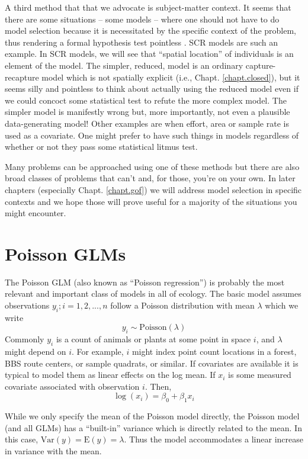 A third method that that we advocate is subject-matter
context. It seems that there are some situations -- some models -- where one should not
have to do model selection because it is necessitated by the specific
context of the problem, thus rendering a formal hypothesis test pointless
\citep{johnson:1999}.
SCR models are such an example. In SCR models, we will see that
``spatial location'' of individuals is an element of the model. The
simpler, reduced, model is an ordinary capture-recapture model which
is not spatially explicit (i.e., Chapt. \ref{chapt.closed}),
but it seems silly and pointless to think about actually using the
reduced model even if we could concoct some statistical test to refute
the more complex model.  The simpler model is manifestly wrong but,
more importantly, not even a plausible data-generating model!
Other examples are when effort, area or
sample rate is used as a covariate. One might prefer to have such things in
models regardless of whether or not they pass some statistical litmus
test.

Many problems can be approached using one of these methods but there
are also broad classes of problems that can't and, for those, you're
on your own. In later chapters (especially Chapt. \ref{chapt.gof}) we will address model selection in
specific contexts and we hope those will prove useful for a majority
of the situations you might encounter.


\section{Poisson GLMs}
\label{glms.sec.poisson}

The Poisson GLM (also known as ``Poisson regression'') is probably the
most relevant and important class of models in all of ecology. The
basic model assumes observations $y_{i}; i=1,2,...,n$ follow a Poisson
distribution with mean $\lambda$ which we write
\[
 	y_{i} \sim \mbox{Poisson}(\lambda)
\]
Commonly $y_{i}$ is a count of animals or plants at some point in
space $i$, and $\lambda$ might depend on $i$. For example, $i$ might index point
count locations in a forest, BBS route centers, or sample quadrats, or
similar.  If covariates are available it is typical to model them as
linear effects on the log mean. If $x_i$ is some measured covariate
associated with observation $i$. Then,
\[
 	\log(x_i) = \beta_0  + \beta_1 x_i
\]

While we only specify the mean of the Poisson model directly, the
Poisson model (and all GLMs) has a ``built-in'' variance which is
directly related to the mean. In this case, $\mbox{Var}(y) = \mbox{E}(y) =
\lambda$. Thus the model accommodates a linear increase in variance
with the mean.

